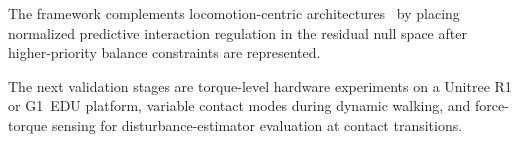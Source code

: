 The framework complements locomotion-centric
architectures~\cite{dicarlo2018dynamic,kim2019highly,bellicoso2016perception,koolen2016design}
by placing normalized predictive interaction regulation in the residual null
space after higher-priority balance constraints are represented.

The next validation stages are torque-level hardware experiments on a Unitree
R1 or G1~EDU platform, variable contact modes during dynamic walking, and
force-torque sensing for disturbance-estimator evaluation at contact
transitions.



